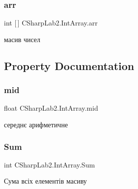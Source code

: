 \subsubsection{\texorpdfstring{arr}{arr}}
{\footnotesize\ttfamily int \mbox{[}$\,$\mbox{]} C\+Sharp\+Lab2.\+Int\+Array.\+arr\hspace{0.3cm}{\ttfamily [private]}}



масив чисел 



\subsection{Property Documentation}
\hypertarget{class_c_sharp_lab2_1_1_int_array_abb9c31974804db308f3628d1d98ece91}{}\label{class_c_sharp_lab2_1_1_int_array_abb9c31974804db308f3628d1d98ece91} 
\subsubsection{\texorpdfstring{mid}{mid}}
{\footnotesize\ttfamily float C\+Sharp\+Lab2.\+Int\+Array.\+mid\hspace{0.3cm}{\ttfamily [get]}}



середнє арифметичне 

\hypertarget{class_c_sharp_lab2_1_1_int_array_a8a753df2be5385be3b9dcf8cdf70d7fb}{}\label{class_c_sharp_lab2_1_1_int_array_a8a753df2be5385be3b9dcf8cdf70d7fb} 
\subsubsection{\texorpdfstring{Sum}{Sum}}
{\footnotesize\ttfamily int C\+Sharp\+Lab2.\+Int\+Array.\+Sum\hspace{0.3cm}{\ttfamily [get]}}



Сума всіх елементів масиву 

\hypertarget{class_c_sharp_lab2_1_1_int_array_a42f8a711f5fbeba620b137326bbc241d}{}\label{class_c_sharp_lab2_1_1_int_array_a42f8a711f5fbeba620b137326bbc241d} 
